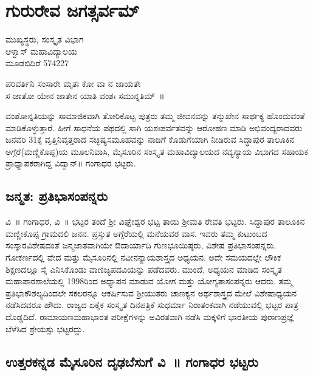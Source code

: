 {\fontsize{14}{16}\selectfont
\chapter{ಗುರುರೇವ ಜಗತ್ಸರ್ವಮ್}

\begin{center}
\smallskip
ಮುಖ್ಯಸ್ಥರು, ಸಂಸ್ಕೃತ ವಿಭಾಗ \\
ಆಳ್ವಾಸ್ ಮಹಾವಿದ್ಯಾಲಯ\\
ಮೂಡಬಿದಿರೆ  \enginline{-}  574227
\addrule
\end{center}
\begin{center}
ಪರಿವರ್ತಿನಿ ಸಂಸಾರೇ ಮೃತಃ ಕೋ ವಾ ನ ಜಾಯತೇ\\
ಸ ಜಾತೋ ಯೇನ ಜಾತೇನ ಯಾತಿ ವಂಶಃ ಸಮುನ್ನತಿಮ್~॥
\end{center}
ವಂಶೋನ್ನತಿಯನ್ನು ಸಾಮಾಜಿಕವಾಗಿ ತೋರಿಕೊಟ್ಟ ಪುತ್ರರು ತಮ್ಮ ಜೀವನವನ್ನು ತನ್ಮುಖೇನ ಸಾರ್ಥಕ್ಯ ಹೊಂದುವಂತೆ ಮಾಡಿಕೊಳ್ಳುತ್ತಾರೆ. ಹೀಗೆ ಸಾಧನೆಯ ಪಥದಲ್ಲಿ ಸಾಗಿ ಯಶಃಪರ್ವತವನ್ನು ಆರೋಹಣ ಮಾಡಿ ಅಭಿವಂದ್ಯರಾದವರು ಜನವರಿ 31ಕ್ಕೆ ವೃತ್ತಿನಿವೃತ್ತರಾದ ಸಚ್ಛಿಷ್ಯಸಮೂಹವನ್ನು ನಾಡಿಗೆ ಕೊಡುಗೆಯಾಗಿ ನೀಡಿರುವ ಸಿದ್ಧಾಪುರ ತಾಲೂಕಿನ ಅಗ್ಗೆರೆ(ಮಣ್ಣಿಕೊಪ್ಪ)ಯ ಮೂಲನಿವಾಸಿ, ಮೈಸೂರಿನ ಸಂಸ್ಕೃತ ಮಹಾವಿದ್ಯಾಲಯದ ನವ್ಯನ್ಯಾಯ ವಿಭಾಗದ ಸಹಾಯಕ ಪ್ರಾಧ್ಯಾಪಕರಾಗಿದ್ದ ವಿದ್ವಾನ್॥ ಗಂಗಾಧರ ಭಟ್ಟರು.

\section*{ಜನ್ಮತ: ಪ್ರತಿಭಾಸಂಪನ್ನರು}

ವಿ~॥ ಗಂಗಾಧರ, ವಿ~॥ ಭಟ್ಟರ ತಂದೆ ಶ್ರೀ ವಿಘ್ನೇಶ್ವರ ಭಟ್ಟ ತಾಯಿ ಶ್ರೀಮತಿ ರೇವತಿ ಭಟ್ಟರು. ಸಿದ್ದಾಪುರ ತಾಲೂಕಿನ ಮಣ್ಣೀಕೊಪ್ಪ ಗ್ರಾಮದಲಿ ಜನನ. ಪ್ರಸ್ತುತ ಅಗ್ಗೆರೆಯಲ್ಲಿ ಮನೆಯವರ ವಾಸ. ಇವರು ತಮ್ಮ ಕುಟುಂಬದ ಸಂಸ್ಕಾರವಿಶೇಷದಂತೆ ಜನ್ಮಜಾತ\-ವಾಗಿಯೇ ಔದಾರ್ಯಾದಿ ಗುಣಭೂಯಿಷ್ಠರು, ವಿಶೇಷ ಪ್ರತಿಭಾಸಂಪನ್ನರು. ಗೋಕರ್ಣ\-ದಲ್ಲಿ ವೇದ ಮತ್ತು ಮೈಸೂರಿನಲ್ಲಿ ನವೀನನ್ಯಾಯಶಾಸ್ತ್ರದ ಅಧ್ಯಯನ. ಅದೇ ಸಮಯದಲ್ಲೇ ಲೌಕಿಕ ಶಿಕ್ಷಣದಲ್ಲೂ ಸೈ ಎನಿಸಿಕೊಂಡು ವಾಣಿಜ್ಯಪದವಿಯನ್ನು ಪಡೆದವರು.  ಮುಂದೆ, ಅಧ್ಯಯನ ಮಾಡಿದ ಸಂಸ್ಕೃತ ಮಹಾಪಾಠಶಾಲೆಯಲ್ಲಿ 1998ರಿಂದ ಅಧ್ಯಾಪನ ಮಾಡುವ ಯೋಗ ಮತ್ತು ಯೋಗ್ಯತಾಸಂಪನ್ನರು ಆದರು. ತಮ್ಮ ಪ್ರತಿಭಾಕೌಶಲ್ಯದಿಂದಲೇ ಸಕಲರನ್ನೂ ಆಕರ್ಷಿಸುವ ಶ್ರೀಯುತರು ಚಾಣಕ್ಯನ ಅರ್ಥಶಾಸ್ತ್ರದ ಮೇಲೆ ವಿಶೇಷಾಧ್ಯಯನ ನಡೆಸಿದವರೂ ಹೌದು. ರಾಜ್ಯದ ಏಕೈಕ ಸಂಸ್ಕೃತ ದಿನಪತ್ರಿಕೆ ಸುಧರ್ಮಾ ನಿರಾತಂಕವಾಗಿ ನಡೆಯುವಲ್ಲಿ ಭಟ್ಟರ ಪಾತ್ರ ದೊಡ್ಡದಿದೆ. ರಾಮಾಯಣ\enginline{-}ಮಹಾಭಾರತ ಪರೀಕ್ಷೆಗಳನ್ನು ಅವಿರತವಾಗಿ ನಡೆಸಿ ಮಕ್ಕಳಿಗೆ ಭಾರತೀಯ ಪುರಾಣಪ್ರಜ್ಞೆ ಬೆಳೆಸಿದ ಶ್ರೇಯಸ್ಸು ಭಟ್ಟರದ್ದು.

\section*{ಉತ್ತರಕನ್ನಡ  \enginline{-}  ಮೈಸೂರಿನ ದೃಢಬೆಸುಗೆ   \enginline{-}   ವಿ~॥ ಗಂಗಾಧರ ಭಟ್ಟರು}

}
